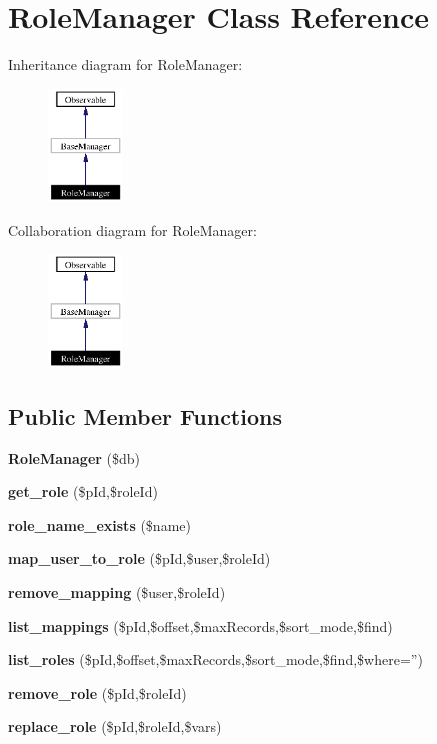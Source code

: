\section{Role\-Manager Class Reference}
\label{classRoleManager}
Inheritance diagram for Role\-Manager:\begin{figure}[H]
\begin{center}
\leavevmode
\includegraphics[width=56pt]{classRoleManager__inherit__graph}
\end{center}
\end{figure}
Collaboration diagram for Role\-Manager:\begin{figure}[H]
\begin{center}
\leavevmode
\includegraphics[width=56pt]{classRoleManager__coll__graph}
\end{center}
\end{figure}
\subsection*{Public Member Functions}
\begin{CompactItemize}
\item 
{\bf Role\-Manager} (\$db)
\item 
{\bf get\_\-role} (\$p\-Id,\$role\-Id)
\item 
{\bf role\_\-name\_\-exists} (\$name)
\item 
{\bf map\_\-user\_\-to\_\-role} (\$p\-Id,\$user,\$role\-Id)
\item 
{\bf remove\_\-mapping} (\$user,\$role\-Id)
\item 
{\bf list\_\-mappings} (\$p\-Id,\$offset,\$max\-Records,\$sort\_\-mode,\$find)
\item 
{\bf list\_\-roles} (\$p\-Id,\$offset,\$max\-Records,\$sort\_\-mode,\$find,\$where='')
\item 
{\bf remove\_\-role} (\$p\-Id,\$role\-Id)
\item 
{\bf replace\_\-role} (\$p\-Id,\$role\-Id,\$vars)
\end{CompactItemize}


